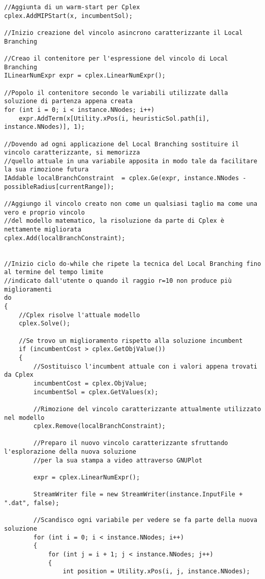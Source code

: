 \documentclass[11pt]{article}
\begin{document}
\begin{lstlisting}
//Aggiunta di un warm-start per Cplex
cplex.AddMIPStart(x, incumbentSol);

//Inizio creazione del vincolo asincrono caratterizzante il Local Branching

//Creao il contenitore per l'espressione del vincolo di Local Branching
ILinearNumExpr expr = cplex.LinearNumExpr();

//Popolo il contenitore secondo le variabili utilizzate dalla soluzione di partenza appena creata
for (int i = 0; i < instance.NNodes; i++)
    expr.AddTerm(x[Utility.xPos(i, heuristicSol.path[i], instance.NNodes)], 1);

//Dovendo ad ogni applicazione del Local Branching sostituire il vincolo caratterizzante, si memorizza
//quello attuale in una variabile apposita in modo tale da facilitare la sua rimozione futura
IAddable localBranchConstraint  = cplex.Ge(expr, instance.NNodes - possibleRadius[currentRange]);

//Aggiungo il vincolo creato non come un qualsiasi taglio ma come una vero e proprio vincolo
//del modello matematico, la risoluzione da parte di Cplex è nettamente migliorata
cplex.Add(localBranchConstraint);


//Inizio ciclo do-while che ripete la tecnica del Local Branching fino al termine del tempo limite
//indicato dall'utente o quando il raggio r=10 non produce più miglioramenti
do
{
    //Cplex risolve l'attuale modello
    cplex.Solve();

    //Se trovo un miglioramento rispetto alla soluzione incumbent
    if (incumbentCost > cplex.GetObjValue())
    {
        //Sostituisco l'incumbent attuale con i valori appena trovati da Cplex
        incumbentCost = cplex.ObjValue;
        incumbentSol = cplex.GetValues(x);

        //Rimozione del vincolo caratterizzante attualmente utilizzato nel modello
        cplex.Remove(localBranchConstraint);

        //Preparo il nuovo vincolo caratterizzante sfruttando l'esplorazione della nuova soluzione
        //per la sua stampa a video attraverso GNUPlot

        expr = cplex.LinearNumExpr();

        StreamWriter file = new StreamWriter(instance.InputFile + ".dat", false);

        //Scandisco ogni variabile per vedere se fa parte della nuova soluzione
        for (int i = 0; i < instance.NNodes; i++)
        {
            for (int j = i + 1; j < instance.NNodes; j++)
            {
                int position = Utility.xPos(i, j, instance.NNodes);


\end{lstlisting}
\end{document}

